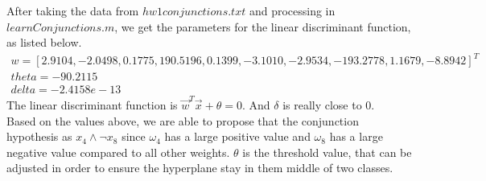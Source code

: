 \begin{enumerate}
\begin{enumerate}
	After taking the data from $hw1conjunctions.txt$ and processing in $learnConjunctions.m$, we get the parameters for the linear discriminant function, as listed below. 
	\begin{gather*}
	w = [2.9104, -2.0498, 0.1775, 190.5196, 0.1399, -3.1010, -2.9534, -193.2778, 1.1679, -8.8942]^T\\
	theta = -90.2115\\
	delta = -2.4158e-13
	\end{gather*}
	The linear discriminant function is $\vec{w}^T\vec{x}+\theta = 0$. And $\delta$ is really close to 0.\\
	Based on the values above, we are able to propose that the conjunction hypothesis as $x_4 \land \lnot x_8$ since $\omega_4$ has a large positive value and $\omega_8$ has a large negative value compared to all other weights. $\theta$ is the threshold value, that can be adjusted in order to ensure the hyperplane stay in them middle of two classes.  
	

\end{enumerate}
\end{enumerate}
